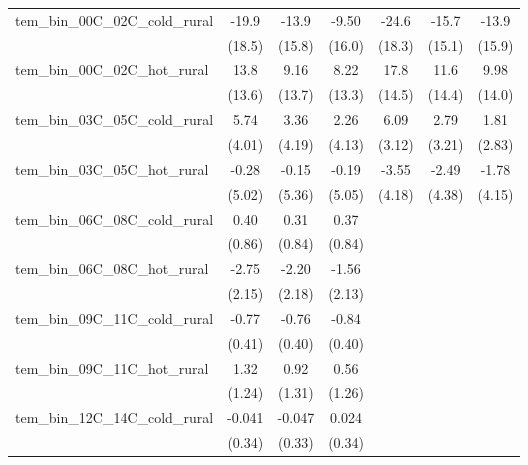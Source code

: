 \documentclass[paper=letterpaper, fontsize=11pt]{article} %
\begin{document}
\begin{longtable}{l*{6}{c}}
tem\_bin\_00C\_02C\_cold\_rural&       -19.9&       -13.9&       -9.50&       -24.6&       -15.7&       -13.9\\
                    &      (18.5)&      (15.8)&      (16.0)&      (18.3)&      (15.1)&      (15.9)\\
tem\_bin\_00C\_02C\_hot\_rural&        13.8&        9.16&        8.22&        17.8&        11.6&        9.98\\
                    &      (13.6)&      (13.7)&      (13.3)&      (14.5)&      (14.4)&      (14.0)\\
tem\_bin\_03C\_05C\_cold\_rural&        5.74&        3.36&        2.26&        6.09&        2.79&        1.81\\
                    &      (4.01)&      (4.19)&      (4.13)&      (3.12)&      (3.21)&      (2.83)\\
tem\_bin\_03C\_05C\_hot\_rural&       -0.28&       -0.15&       -0.19&       -3.55&       -2.49&       -1.78\\
                    &      (5.02)&      (5.36)&      (5.05)&      (4.18)&      (4.38)&      (4.15)\\
tem\_bin\_06C\_08C\_cold\_rural&        0.40&        0.31&        0.37&            &            &            \\
                    &      (0.86)&      (0.84)&      (0.84)&            &            &            \\
tem\_bin\_06C\_08C\_hot\_rural&       -2.75&       -2.20&       -1.56&            &            &            \\
                    &      (2.15)&      (2.18)&      (2.13)&            &            &            \\
tem\_bin\_09C\_11C\_cold\_rural&       -0.77&       -0.76&       -0.84&            &            &            \\
                    &      (0.41)&      (0.40)&      (0.40)&            &            &            \\
tem\_bin\_09C\_11C\_hot\_rural&        1.32&        0.92&        0.56&            &            &            \\
                    &      (1.24)&      (1.31)&      (1.26)&            &            &            \\
tem\_bin\_12C\_14C\_cold\_rural&      -0.041&      -0.047&       0.024&            &            &            \\
                    &      (0.34)&      (0.33)&      (0.34)&            &            &            \\

\end{longtable}
\end{document}
